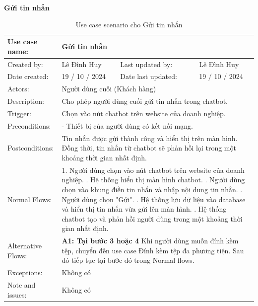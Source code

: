 \textbf{Gửi tin nhắn}
\begin{table}[H]
    \centering
    \begin{tabular}{|l|l|l|l|} 
        \hline
        Use case name: & \multicolumn{3}{|l|}{Gửi tin nhắn} \\
        \hline
        Created by: & Lê Đình Huy & Last updated by: & Lê Đình Huy \\
        \hline
        Date created: & 19 / 10 / 2024 & Date last updated: & 19 / 10 / 2024 \\
        \hline
        Actors: & \multicolumn{3}{|l|}{Người dùng cuối (Khách hàng)} \\
        \hline
        Description: & \multicolumn{3}{|p{12cm}|}{Cho phép người dùng cuối gửi tin nhắn trong chatbot.} \\ 
        \hline
        Trigger: & \multicolumn{3}{|p{12cm}|}{Chọn vào nút chatbot trên website của doanh nghiệp.} \\
        \hline
        Preconditions: & \multicolumn{3}{|p{12cm}|}{- Thiết bị của người dùng có kết nối mạng.} \\
        \hline
        Postconditions: & \multicolumn{3}{|p{12cm}|}{Tin nhắn được gửi thành công và hiển thị trên màn hình. \newline
        Đồng thời, tin nhắn từ chatbot sẽ phản hồi lại trong một khoảng thời gian nhất định.} \\
        \hline
        Normal Flows: & \multicolumn{3}{|p{12cm}|}{1. Người dùng chọn vào nút chatbot trên website của doanh nghiệp. \newline
        2. Hệ thống hiển thị màn hình chatbot. \newline
        3. Người dùng chọn vào khung điền tin nhắn và nhập nội dung tin nhắn. \newline
        4. Người dùng chọn "Gửi". \newline
        5. Hệ thống lưu dữ liệu vào database và hiển thị tin nhắn vừa gửi lên màn hình. \newline
        6. Hệ thống chatbot tạo và phản hồi người dùng trong một khoảng thời gian nhất định.} \\
        \hline
        Alternative Flows: & \multicolumn{3}{|p{12cm}|}{\textbf{A1: Tại bước 3 hoặc 4} \newline
        Khi người dùng muốn đính kèm tệp, chuyển đến use case Đính kèm tệp đa phương tiện. Sau đó tiếp tục tại bước đó trong Normal flows.} \\
        \hline
        Exceptions: & \multicolumn{3}{|p{12cm}|}{Không có} \\
        \hline
        Note and issues: & \multicolumn{3}{|p{12cm}|}{Không có} \\
        \hline
    \end{tabular}
    \caption{Use case scenario cho Gửi tin nhắn}
\end{table}



